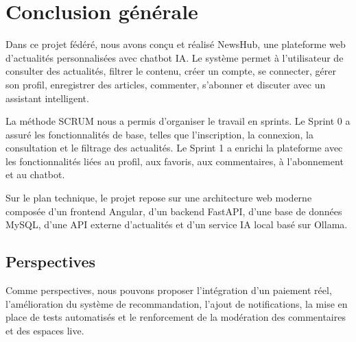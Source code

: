 \documentclass[12pt,a4paper]{report}
\begin{document}
\chapter*{Conclusion générale}
Dans ce projet fédéré, nous avons conçu et réalisé NewsHub, une plateforme web d'actualités personnalisées avec chatbot IA. Le système permet à l'utilisateur de consulter des actualités, filtrer le contenu, créer un compte, se connecter, gérer son profil, enregistrer des articles, commenter, s'abonner et discuter avec un assistant intelligent.

La méthode SCRUM nous a permis d'organiser le travail en sprints. Le Sprint 0 a assuré les fonctionnalités de base, telles que l'inscription, la connexion, la consultation et le filtrage des actualités. Le Sprint 1 a enrichi la plateforme avec les fonctionnalités liées au profil, aux favoris, aux commentaires, à l'abonnement et au chatbot.

Sur le plan technique, le projet repose sur une architecture web moderne composée d'un frontend Angular, d'un backend FastAPI, d'une base de données MySQL, d'une API externe d'actualités et d'un service IA local basé sur Ollama.

\section*{Perspectives}
Comme perspectives, nous pouvons proposer l'intégration d'un paiement réel, l'amélioration du système de recommandation, l'ajout de notifications, la mise en place de tests automatisés et le renforcement de la modération des commentaires et des espaces live.
\end{document}
